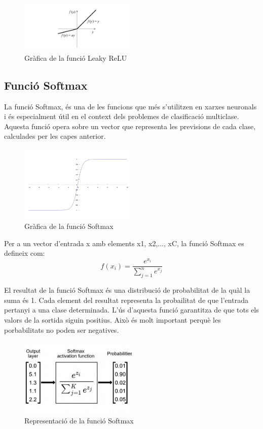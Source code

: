 \begin{figure}[h!]
    \centering
    \includegraphics[width=0.5\textwidth]{./figures/leaky_ReLU.png}
    \caption{Gràfica de la funció Leaky ReLU}
\end{figure}

\subsection{Funció Softmax}
La funció Softmax, és una de les funcions que més s'utilitzen en xarxes neuronals i és especialment útil en el context dels problemes de clasificació multiclase. Aquesta funció opera sobre un vector que representa les previsions de cada clase, calculades per les capes anterior.

\begin{figure}[h!]
    \centering
    \includegraphics[width=0.5\textwidth]{./figures/Softmax.png}
    \caption{Gràfica de la funció Softmax}
\end{figure}

Per a un vector d'entrada x amb elements x1, x2,..., xC, la funció Softmax es defineix com:
\[f(x_i) = \frac{e^{x_i}}{\sum_{j=1}^{n} e^{x_j}}\]

El resultat de la funció Softmax és una distribució de probabilitat de la quàl la suma és 1. Cada element del resultat representa la probailitat de que l'entrada pertanyi a una clase determinada. L'ús d'aquesta funció garantitza de que tots els valors de la sortida siguin positius. Això és molt important perquè les porbabilitats no poden ser negatives.

\begin{figure}[H]
    \centering
    \includegraphics[width=0.5\textwidth]{./figures/representacio_Softmax.png}
    \caption{Representació de la funció Softmax}
\end{figure}

